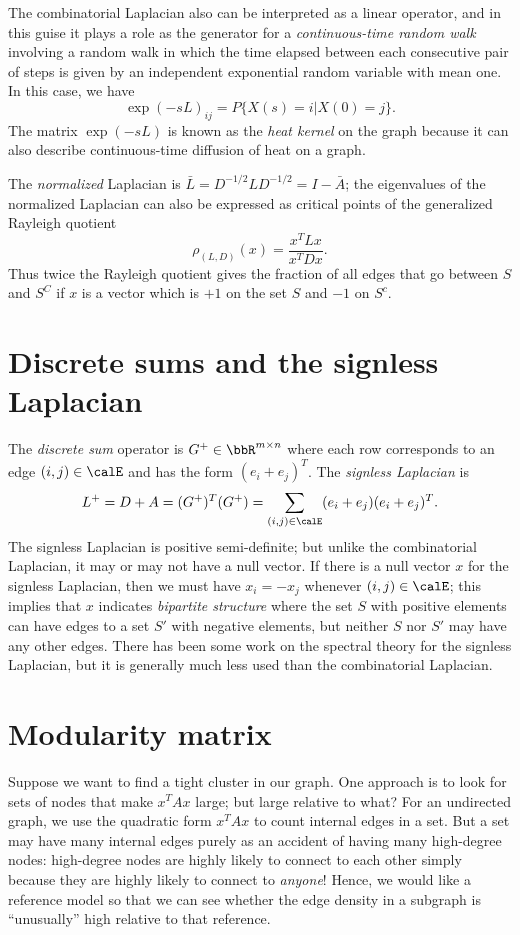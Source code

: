 \documentclass[12pt, leqno]{article} %
\begin{document}
The combinatorial Laplacian also can be interpreted as a linear
operator, and in this guise it plays a role as the generator for a
{\em continuous-time random walk} involving a random walk in which
the time elapsed between each consecutive pair of steps is given by
an independent exponential random variable with mean one.  In this
case, we have
\[
  \exp(-sL)_{ij} = P\{X(s) = i | X(0) = j\}.
\]
The matrix $\exp(-sL)$ is known as the {\em heat kernel} on the graph
because it can also describe continuous-time diffusion of heat on
a graph.

The {\em normalized} Laplacian is $\bar{L} = D^{-1/2} L D^{-1/2} = I-\bar{A}$;
the eigenvalues of the normalized Laplacian can also be expressed
as critical points of the generalized Rayleigh quotient
\[
  \rho_{(L,D)}(x) = \frac{x^T L x}{x^T D x}.
\]
Thus twice the Rayleigh quotient gives the fraction of all edges
that go between $S$ and $S^C$ if $x$ is a vector which is $+1$ on the
set $S$ and $-1$ on $S^c$.

\section{Discrete sums and the signless Laplacian}

The {\em discrete sum} operator is $G^+ \in \bbR^{m \times n}$ where
each row corresponds to an edge $(i,j) \in \calE$ and has the form
$(e_i + e_j)^T$.  The {\em signless Laplacian} is
\[
  L^+ = D + A = (G^+)^T (G^+) = \sum_{(i,j) \in \calE} (e_i + e_j) (e_i + e_j)^T.
\]
The signless Laplacian is positive semi-definite; but unlike the
combinatorial Laplacian, it may or may not have a null vector.  If
there is a null vector $x$ for the signless Laplacian, then we must
have $x_i = -x_j$ whenever $(i,j) \in \calE$; this implies that $x$
indicates {\em bipartite structure} where the set $S$ with positive
elements can have edges to a set $S'$ with negative elements,
but neither $S$ nor $S'$ may have any other edges.  There has been
some work on the spectral theory for the signless Laplacian, but it
is generally much less used than the combinatorial Laplacian.

\section{Modularity matrix}

Suppose we want to find a tight cluster in our graph.  One approach is
to look for sets of nodes that make $x^T A x$ large; but large
relative to what?  For an undirected graph, we use the quadratic form
$x^T A x$ to count internal edges in a set.  But a set may have many
internal edges purely as an accident of having many high-degree nodes:
high-degree nodes are highly likely to connect to each other simply
because they are highly likely to connect to {\em anyone}!  Hence,
we would like a reference model so that we can see whether the edge
density in a subgraph is ``unusually'' high relative to that
reference.
\end{document}
